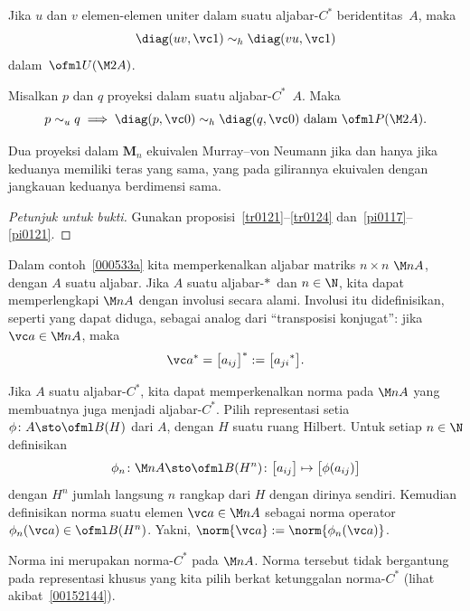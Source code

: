 \begin{exam}\label{0060129d} Jika $u$ dan $v$ elemen-elemen uniter dalam suatu aljabar-$C^*$ beridentitas~$A$, maka
   \[ \diag(uv,\vc 1) \sim_h \diag(vu, \vc 1) \]
dalam~$\ofml U(\M 2A)$.
\end{exam}

\begin{prop}\label{0060244} Misalkan $p$ dan $q$ proyeksi dalam suatu aljabar-$C^*$~$A$. Maka
   \[ p \sim_u q \implies \diag(p,\vc 0) \sim_h \diag(q,\vc 0) \text{ dalam $\ofml P(\M 2A)$.} \]
\end{prop}

\begin{exam}\label{0060247fa} Dua proyeksi dalam $\mathbf M_n$ ekuivalen Murray--von Neumann jika dan hanya jika keduanya memiliki teras yang sama,
yang pada gilirannya ekuivalen dengan jangkauan keduanya berdimensi sama.
\end{exam}

\begin{proof}[\emph{Petunjuk untuk bukti}] Gunakan proposisi~\ref{tr0121}--\ref{tr0124} dan~\ref{pi0117}--\ref{pi0121}.   \ns
\end{proof}

Dalam contoh~\ref{000533a} kita memperkenalkan aljabar matriks $n \times n$ $\M nA$, dengan $A$ suatu aljabar. Jika $A$ suatu
aljabar-$*\,$ dan $n \in \N$, kita dapat memperlengkapi $\M nA$ dengan involusi secara alami. Involusi itu didefinisikan, seperti yang dapat diduga,
sebagai analog dari ``transposisi konjugat'': jika $\vc a \in \M nA$, maka
   \[ \vc a^* = \bigl[a_{ij}\bigr]^* := \bigl[{a_{ji}}^*\bigr]. \]

Jika $A$ suatu aljabar-$C^*$, kita dapat memperkenalkan norma pada $\M nA$ yang membuatnya juga menjadi aljabar-$C^*$.
Pilih representasi setia $\phi\colon A \sto \ofml B(H)$ dari $A$, dengan $H$ suatu ruang Hilbert. Untuk setiap $n \in \N$
definisikan
   \[ \phi_n\colon \M nA \sto \ofml B(H^n)\colon \bigl[a_{ij}\bigr] \mapsto \bigl[ \phi(a_{ij})\bigr] \]
dengan $H^n$ jumlah langsung $n$ rangkap dari $H$ dengan dirinya sendiri. Kemudian definisikan norma suatu elemen $\vc a \in \M nA$ sebagai
norma operator $\phi_n(\vc a) \in \ofml B(H^n)$. Yakni, $\norm{\vc a} := \norm{\phi_n(\vc a)}$.

Norma ini merupakan norma-$C^*$ pada $\M nA$. Norma tersebut tidak bergantung pada representasi khusus yang kita pilih berkat
ketunggalan norma-$C^*$ (lihat akibat~\ref{00152144}).

